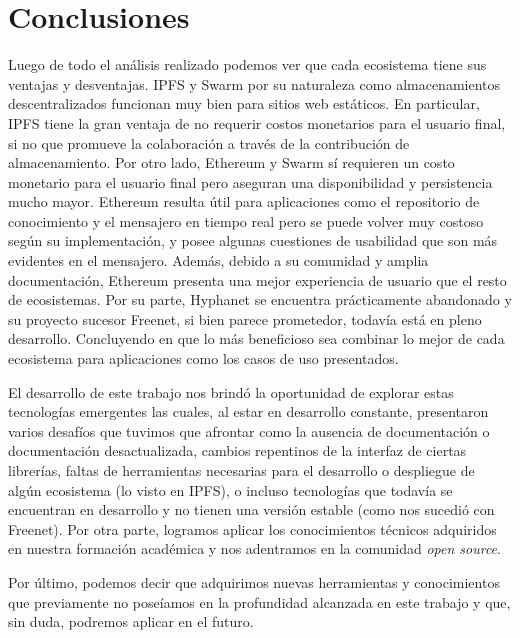 \section{Conclusiones}

Luego de todo el análisis realizado podemos ver que cada ecosistema tiene sus ventajas y desventajas. IPFS y Swarm por su naturaleza como almacenamientos descentralizados funcionan muy bien para sitios web estáticos. En particular, IPFS tiene la gran ventaja de no requerir costos monetarios para el usuario final, si no que promueve la colaboración a través de la contribución de almacenamiento. Por otro lado, Ethereum y Swarm sí requieren un costo monetario para el usuario final pero aseguran una disponibilidad y persistencia mucho mayor. Ethereum resulta útil para aplicaciones como el repositorio de conocimiento y el mensajero en tiempo real pero se puede volver muy costoso según su implementación, y posee algunas cuestiones de usabilidad que son más evidentes en el mensajero. Además, debido a su comunidad y amplia documentación, Ethereum presenta una mejor experiencia de usuario que el resto de ecosistemas. Por su parte, Hyphanet se encuentra prácticamente abandonado y su proyecto sucesor Freenet, si bien parece prometedor, todavía está en pleno desarrollo. Concluyendo en que lo más beneficioso sea combinar lo mejor de cada ecosistema para aplicaciones como los casos de uso presentados.

El desarrollo de este trabajo nos brindó la oportunidad de explorar estas tecnologías emergentes las cuales, al estar en desarrollo constante, presentaron varios desafíos que tuvimos que afrontar como la ausencia de documentación o documentación desactualizada, cambios repentinos de la interfaz de ciertas librerías, faltas de herramientas necesarias para el desarrollo o despliegue de algún ecosistema (lo visto en IPFS), o incluso tecnologías que todavía se encuentran en desarrollo y no tienen una versión estable (como nos sucedió con Freenet). Por otra parte, logramos aplicar los conocimientos técnicos adquiridos en nuestra formación académica y nos adentramos en la comunidad \textit{open source}.

Por último, podemos decir que adquirimos nuevas herramientas y conocimientos que previamente no poseíamos en la profundidad alcanzada en este trabajo y que, sin duda, podremos aplicar en el futuro.

